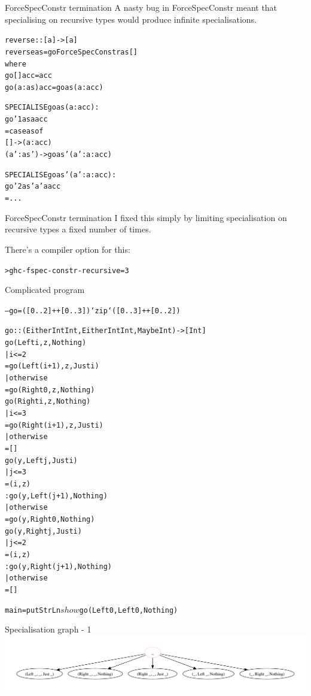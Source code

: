 \documentclass[t]{beamer}
\newcommand{\oomph}[1]{\textcolor[rgb]{0.0,0.5,0.9}{#1}}
\begin{document}
\begin{frame}[fragile]{ForceSpecConstr termination}
A nasty bug in ForceSpecConstr meant that specialising on recursive types would produce infinite specialisations.

\begin{alltt}
reverse :: [a] -> [a]
reverse as = go ForceSpecConstr as []
 where
  go []     acc = acc
  go (a:as) acc = \oomph{go as (a:acc)}

SPECIALISE \oomph{go as (a:acc)}:
go'1 as a acc
 = case as of
    [] -> (a:acc)
    (a':as') -> \oomph{go as' (a':a:acc)}

SPECIALISE \oomph{go as' (a':a:acc)}:
go'2 as' a' a acc
 = ...
\end{alltt}
\end{frame}

\begin{frame}[fragile]{ForceSpecConstr termination}
I fixed this simply by limiting specialisation on recursive types a fixed number of times.

There's a compiler option for this:
\begin{alltt}
>ghc -fspec-constr-recursive=3
\end{alltt}
\end{frame}


\begin{frame}[fragile]{Complicated program}
\begin{alltt}\tiny
-- go = ([0..2] ++ [0..3]) `zip` ([0..3] ++ [0..2])

go :: (Either Int Int, Either Int Int, Maybe Int) -> [Int]
go (Left i, z, Nothing)
 | i <= 2
 = \oomph{go (Left (i+1), z, Just i)}
 | otherwise
 = \oomph{go (Right 0,    z, Nothing)}
go (Right i, z, Nothing)
 | i <= 3
 = \oomph{go (Right (i+1), z, Just i)}
 | otherwise
 = []
go (y, Left  j, Just i)
 | j <= 3
 = (i, z)
 : \oomph{go (y, Left (j+1), Nothing)}
 | otherwise
 = \oomph{go (y, Right 0,    Nothing)}
go (y, Right j, Just i)
 | j <= 2
 = (i, z)
 : \oomph{go (y, Right (j+1), Nothing)}
 | otherwise
 = []

main = putStrLn $ show $ go (Left 0, Left 0, Nothing)
\end{alltt}
\end{frame}

\begin{frame}{Specialisation graph - 1}
\includegraphics[scale=0.33, trim=10mm 0mm 0mm 10mm, clip]{seeding-1.pdf}
\end{frame}
\end{document}
